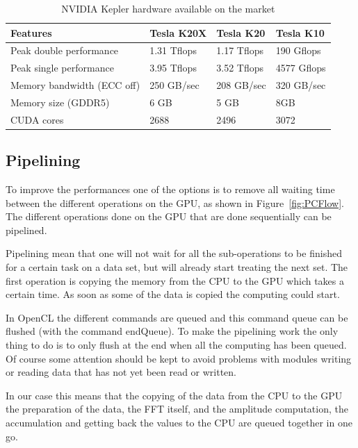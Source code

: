 \begin{table}[H]
	\centering
	\caption{NVIDIA Kepler hardware available on the market}
	\label{tab:kepler}
	\begin{tabular}{|l|l|l|l|}
		\hline
			Features & Tesla K20X & Tesla K20 & Tesla K10 \\
		\hline
		\hline
			Peak double performance & 1.31 Tflops & 1.17 Tflops & 190 Gflops \\
		\hline
			Peak single performance & 3.95 Tflops & 3.52 Tflops & 4577 Gflops \\
		\hline
			Memory bandwidth (ECC off) & 250 GB/sec & 208 GB/sec & 320 GB/sec \\
		\hline
			Memory size (GDDR5) & 6 GB & 5 GB & 8GB \\
		\hline
			CUDA cores & 2688 & 2496 & 3072 \\
		\hline
	\end{tabular}
\end{table}


   \subsection{Pipelining}

   To improve the performances one of the options is to remove all waiting time between the different operations on the \gls{GPU}, as shown in Figure~\ref{fig:PCFlow}. The different operations done on the \gls{GPU} that are done sequentially can be pipelined.

   Pipelining mean that one will not wait for all the sub-operations to be finished for a certain task on a data set, but will already start treating the next set. The first operation is copying the memory from the \gls{CPU} to the \gls{GPU} which takes a certain time. As soon as some of the data is copied the computing could start.

   In \gls{OpenCL} the different commands are queued and this command queue can be flushed (with the command endQueue). To make the pipelining work the only thing to do is to only flush at the end when all the computing has been queued. Of course some attention should be kept to avoid problems with modules writing or reading data that has not yet been read or written.

   In our case this means that the copying of the data from the \gls{CPU} to the \gls{GPU} the preparation of the data, the \gls{FFT} itself, and the amplitude computation, the accumulation and getting back the values to the \gls{CPU} are queued together in one go.

